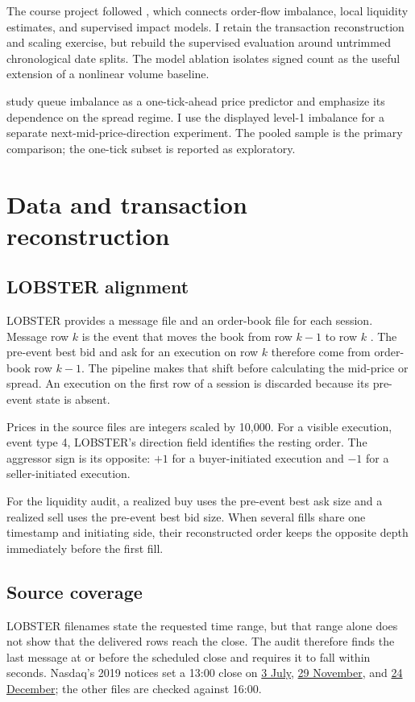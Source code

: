 \documentclass[11pt,a4paper]{article}
\begin{document}
The course project followed \citet{bugaenko2019}, which connects order-flow
imbalance, local liquidity estimates, and supervised impact models. I retain the
transaction reconstruction and scaling exercise, but rebuild the supervised
evaluation around untrimmed chronological date splits. The model ablation
isolates signed count as the useful extension of a nonlinear volume baseline.

\citet{gould2015} study queue imbalance as a one-tick-ahead price predictor and
emphasize its dependence on the spread regime. I use the displayed level-1
imbalance for a separate next-mid-price-direction experiment. The pooled sample
is the primary comparison; the one-tick subset is reported as exploratory.

\section{Data and transaction reconstruction}

\subsection{LOBSTER alignment}

LOBSTER provides a message file and an order-book file for each session. Message
row $k$ is the event that moves the book from row $k-1$ to row $k$
\citep{lobsterstructure}. The pre-event best bid and ask for an execution on row
$k$ therefore come from order-book row $k-1$. The pipeline makes that shift
before calculating the mid-price or spread. An execution on
the first row of a session is discarded because its pre-event state is absent.

Prices in the source files are integers scaled by 10,000. For a visible
execution, event type 4, LOBSTER's direction field identifies the resting order.
The aggressor sign is its opposite: $+1$ for a buyer-initiated execution and
$-1$ for a seller-initiated execution.

For the liquidity audit, a realized buy uses the pre-event best ask size and a
realized sell uses the pre-event best bid size. When several fills share one
timestamp and initiating side, their reconstructed order keeps the opposite
depth immediately before the first fill.

\subsection{Source coverage}

LOBSTER filenames state the requested time range, but that range alone does not
show that the delivered rows reach the close. The audit therefore finds the
last message at or before the scheduled close and requires it to fall within
\MaximumCoverageGapSeconds{} seconds. Nasdaq's 2019 notices set a 13:00 close
on \href{https://www.nasdaqtrader.com/TraderNews.aspx?id=2019-50}{3 July},
\href{https://www.nasdaqtrader.com/TraderNews.aspx?id=ETA2019-87}{29 November},
and \href{https://www.nasdaqtrader.com/TraderNews.aspx?id=ETA2019-93}{24
December}; the other files are checked against 16:00.
\end{document}
